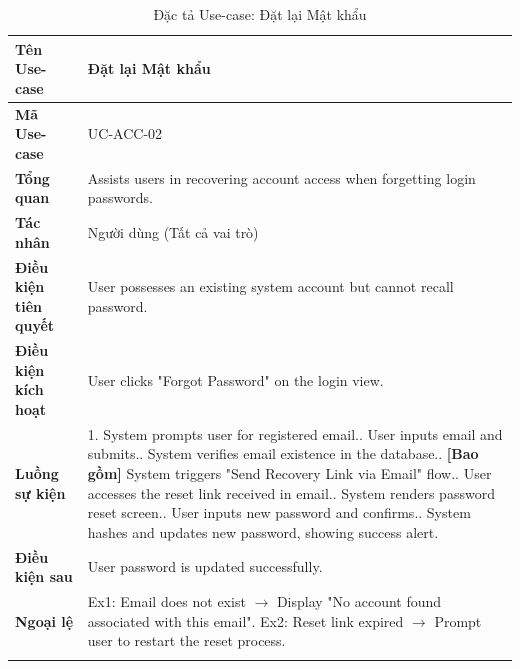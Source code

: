 \newpage
\begin{longtable}{|p{3.5cm}|p{11.5cm}|}
    \hline
    \textbf{Tên Use-case} & \textbf{Đặt lại Mật khẩu} \\
    \hline
    \textbf{Mã Use-case} & UC-ACC-02 \\
    \hline
    \textbf{Tổng quan} & Assists users in recovering account access when forgetting login passwords. \\
    \hline
    \textbf{Tác nhân} & Người dùng (Tất cả vai trò) \\
    \hline
    \textbf{Điều kiện tiên quyết} & User possesses an existing system account but cannot recall password. \\
    \hline
    \textbf{Điều kiện kích hoạt} & User clicks "Forgot Password" on the login view. \\
    \hline
    \textbf{Luồng sự kiện} & 
    1. System prompts user for registered email.\newline
    2. User inputs email and submits.\newline
    3. System verifies email existence in the database.\newline
    4. \textbf{[Bao gồm]} System triggers "Send Recovery Link via Email" flow.\newline
    5. User accesses the reset link received in email.\newline
    6. System renders password reset screen.\newline
    7. User inputs new password and confirms.\newline
    8. System hashes and updates new password, showing success alert. \\
    \hline
    \textbf{Điều kiện sau} & User password is updated successfully. \\
    \hline
    \textbf{Ngoại lệ} & 
    Ex1: Email does not exist $\rightarrow$ Display "No account found associated with this email".\newline
    Ex2: Reset link expired $\rightarrow$ Prompt user to restart the reset process. \\
    \hline
    \caption{Đặc tả Use-case: Đặt lại Mật khẩu}
\end{longtable}

